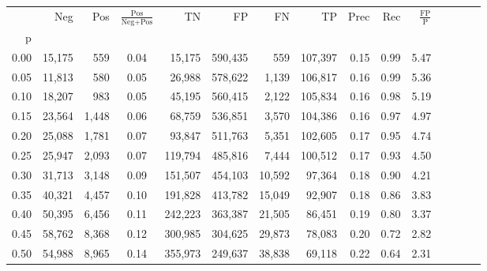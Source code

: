 \begin{tabular}{rrrcrrrrrrrrrrr}
\toprule
{} &     Neg &    Pos & $\frac{\text{Pos}}{\text{Neg}+\text{Pos}}$ &       TN &       FP &       FN &       TP &  Prec &   Rec & $\frac{\text{FP}}{\text{P}}$ \\
p    &         &        &                                            &          &          &          &          &       &       &                              \\
\midrule
0.00 &  15,175 &    559 &                                       0.04 &   15,175 &  590,435 &      559 &  107,397 &  0.15 &  0.99 &                         5.47 \\
0.05 &  11,813 &    580 &                                       0.05 &   26,988 &  578,622 &    1,139 &  106,817 &  0.16 &  0.99 &                         5.36 \\
0.10 &  18,207 &    983 &                                       0.05 &   45,195 &  560,415 &    2,122 &  105,834 &  0.16 &  0.98 &                         5.19 \\
0.15 &  23,564 &  1,448 &                                       0.06 &   68,759 &  536,851 &    3,570 &  104,386 &  0.16 &  0.97 &                         4.97 \\
0.20 &  25,088 &  1,781 &                                       0.07 &   93,847 &  511,763 &    5,351 &  102,605 &  0.17 &  0.95 &                         4.74 \\
0.25 &  25,947 &  2,093 &                                       0.07 &  119,794 &  485,816 &    7,444 &  100,512 &  0.17 &  0.93 &                         4.50 \\
0.30 &  31,713 &  3,148 &                                       0.09 &  151,507 &  454,103 &   10,592 &   97,364 &  0.18 &  0.90 &                         4.21 \\
0.35 &  40,321 &  4,457 &                                       0.10 &  191,828 &  413,782 &   15,049 &   92,907 &  0.18 &  0.86 &                         3.83 \\
0.40 &  50,395 &  6,456 &                                       0.11 &  242,223 &  363,387 &   21,505 &   86,451 &  0.19 &  0.80 &                         3.37 \\
0.45 &  58,762 &  8,368 &                                       0.12 &  300,985 &  304,625 &   29,873 &   78,083 &  0.20 &  0.72 &                         2.82 \\
0.50 &  54,988 &  8,965 &                                       0.14 &  355,973 &  249,637 &   38,838 &   69,118 &  0.22 &  0.64 &                         2.31 \\

\end{tabular}
